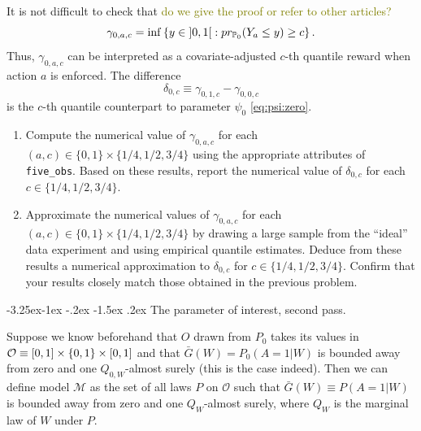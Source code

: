 \documentclass[]{article}
\makeatletter
\renewcommand\subsection{\@startsection{subsection}{3}{\z@}%
                                     {-3.25ex\@plus -1ex \@minus -.2ex}%
                                     {-1.5ex \@plus .2ex}%
                                     {\normalfont\normalsize\bfseries}}
\newcommand{\bbP}{\mathbb{P}}
\newcommand{\calM}{\mathcal{M}}
\newcommand{\calO}{\mathcal{O}}
\newcommand{\Gbar}{\bar{G}}
\newcommand{\tcg}[1]{\textcolor{olive}{#1}}
\theoremstyle{definition}
\theoremstyle{definition}
\theoremstyle{definition}
\theoremstyle{remark}
\makeatother
\begin{document}
It is not difficult to check that
\tcg{do  we give the proof or refer to other
articles?}
\begin{equation*}\gamma_{0,a,c}     =     \inf\left\{y     \in
\interval[open]{0}{1}      :      pr_{\bbP_{0}}(Y_a     \leq      y)      \geq
c\right\}.\end{equation*} Thus, \(\gamma_{0,a,c}\) can be interpreted as
a covariate-adjusted \(c\)-th quantile reward when action \(a\) is
enforced. The difference
\begin{equation*}\delta_{0,c}    \equiv     \gamma_{0,1,c}    -
\gamma_{0,0,c}\end{equation*} is the \(c\)-th quantile counterpart to
parameter \(\psi_{0}\) \eqref{eq:psi:zero}.

\begin{enumerate}
\def\labelenumi{\arabic{enumi}.}
\item
  \textdbend Compute the numerical value of \(\gamma_{0,a,c}\) for each
  \((a,c) \in \{0,1\} \times \{1/4, 1/2, 3/4\}\) using the appropriate
  attributes of \texttt{five\_obs}. Based on these results, report the
  numerical value of \(\delta_{0,c}\) for each
  \(c \in \{1/4, 1/2, 3/4\}\).
\item
  Approximate the numerical values of \(\gamma_{0,a,c}\) for each
  \((a,c) \in \{0,1\} \times \{1/4, 1/2, 3/4\}\) by drawing a large
  sample from the ``ideal'' data experiment and using empirical quantile
  estimates. Deduce from these results a numerical approximation to
  \(\delta_{0,c}\) for \(c \in \{1/4, 1/2, 3/4\}\). Confirm that your
  results closely match those obtained in the previous problem.
\end{enumerate}

\subsection{The parameter of interest, second pass.}
\label{subsec:parameter:second}

Suppose we know beforehand that \(O\) drawn from \(P_{0}\) takes its
values in \(\calO \equiv [0,1] \times \{0,1\} \times \interval{0}{1}\)
and that \(\Gbar(W) = P_{0}(A=1|W)\) is bounded away from zero and one
\(Q_{0,W}\)-almost surely (this is the case indeed). Then we can define
model \(\calM\) as the set of all laws \(P\) on \(\calO\) such that
\(\Gbar(W) \equiv P(A=1|W)\) is bounded away from zero and one
\(Q_{W}\)-almost surely, where \(Q_{W}\) is the marginal law of \(W\)
under \(P\).
\end{document}
